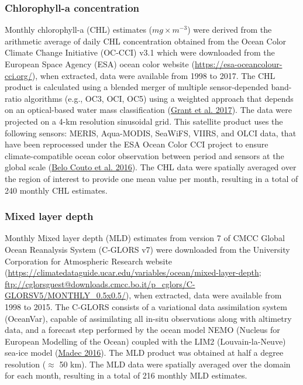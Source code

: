 \documentclass[
]{article}
\begin{document}
\hypertarget{chlorophyll-a-concentration}{%
\subsubsection{Chlorophyll-a concentration}\label{chlorophyll-a-concentration}}

Monthly chlorophyll-a (CHL) estimates (\(mg \times m^{-3}\)) were derived from the arithmetic average of daily CHL concentration obtained from the Ocean Color Climate Change Initiative (OC-CCI) v3.1 which were downloaded from the European Space Agency (ESA) ocean color website (\url{https://esa-oceancolour-cci.org/}), when extracted, data were available from 1998 to 2017. The CHL product is calculated using a blended merger of multiple sensor-depended band-ratio algorithms (e.g., OC3, OCI, OC5) using a weighted approach that depends on an optical-based water mass classification (\protect\hyperlink{ref-grantProductUserGuide2017}{Grant et al. 2017}). The data were projected on a 4-km resolution sinusoidal grid. This satellite product uses the following sensors: MERIS, Aqua-MODIS, SeaWiFS, VIIRS, and OLCI data, that have been reprocessed under the ESA Ocean Color CCI project to ensure climate-compatible ocean color observation between period and sensors at the global scale (\protect\hyperlink{ref-belocoutoIntercomparisonOCCCIChlorophylla2016}{Belo Couto et al. 2016}). The CHL data were spatially averaged over the region of interest to provide one mean value per month, resulting in a total of 240 monthly CHL estimates.

\hypertarget{mixed-layer-depth}{%
\subsubsection{Mixed layer depth}\label{mixed-layer-depth}}

Monthly Mixed layer depth (MLD) estimates from version 7 of CMCC Global Ocean Reanalysis System (C-GLORS v7) were downloaded from the University Corporation for Atmospheric Research website (\url{https://climatedataguide.ucar.edu/variables/ocean/mixed-layer-depth}; \url{ftp://cglorsguest@downloads.cmcc.bo.it/p_cglors/C-GLORSV5/MONTHLY_0.5x0.5/}), when extracted, data were available from 1998 to 2015. The C-GLORS consists of a variational data assimilation system (OceanVar), capable of assimilating all in-situ observations along with altimetry data, and a forecast step performed by the ocean model NEMO (Nucleus for European Modelling of the Ocean) coupled with the LIM2 (Louvain-la-Neuve) sea-ice model (\protect\hyperlink{ref-madecNEMOOceanEngine2016}{Madec 2016}). The MLD product was obtained at half a degree resolution (\(\approx\) 50 km). The MLD data were spatially averaged over the domain for each month, resulting in a total of 216 monthly MLD estimates.
\end{document}

